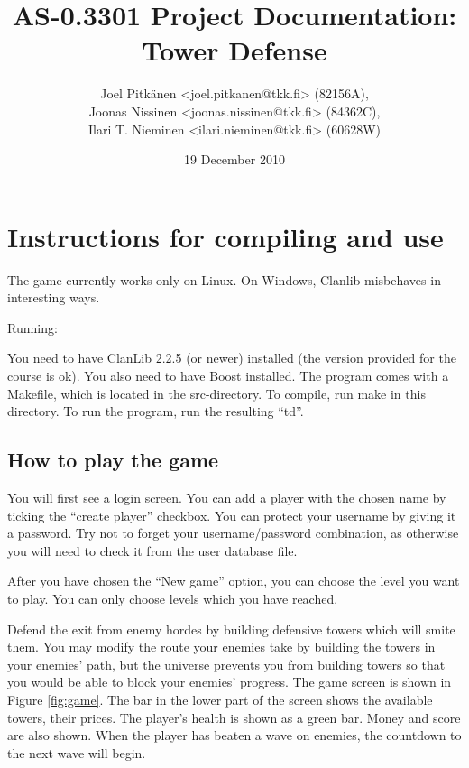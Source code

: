 \documentclass[11pt]{article}
\title{AS-0.3301 Project Documentation: Tower Defense}
\author{Joel Pitkänen <joel.pitkanen@tkk.fi> (82156A),\\ Joonas Nissinen <joonas.nissinen@tkk.fi> (84362C),\\ Ilari T. Nieminen <ilari.nieminen@tkk.fi> (60628W)}
\date{19 December 2010}
\begin{document}
\maketitle

\setcounter{tocdepth}{3}
\tableofcontents
\vspace*{1cm}

\section{Instructions for compiling and use}
\label{sec-1}


The game currently works only on Linux. On Windows, Clanlib misbehaves in interesting ways.

Running:

You need to have ClanLib 2.2.5 (or newer) installed (the version
provided for the course is ok). You also need to have Boost
installed. The program comes with a Makefile, which is located in the
src-directory. To compile, run make in this directory. To run the
program, run the resulting ``td''.

\subsection{How to play the game}
\label{sec-1_1}

You will first see a login screen. You can add a player with the
chosen name by ticking the ``create player'' checkbox. You can protect
your username by giving it a password. Try not to forget your
username/password combination, as otherwise you will need to check it
from the user database file.

After you have chosen the ``New game'' option, you can choose the level
you want to play. You can only choose levels which you have reached.

Defend the exit from enemy hordes by building defensive towers which
will smite them. You may modify the route your enemies take by
building the towers in your enemies' path, but the universe prevents
you from building towers so that you would be able to block your
enemies' progress. The game screen is shown in Figure
\ref{fig:game}. The bar in the lower part of the screen shows the
available towers, their prices. The player's health is shown as a
green bar. Money and score are also shown. When the player has beaten
a wave on enemies, the countdown to the next wave will begin.
\end{document}
